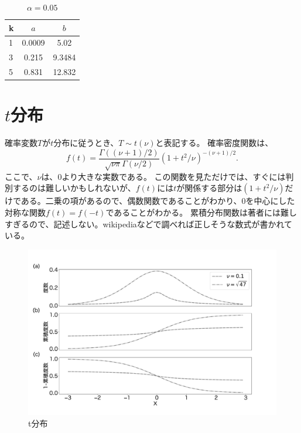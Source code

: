 \begin{table}[hbtp]
    \caption{$\alpha=0.05$}
    \label{table:chi2_confidence}
    \centering
    \begin{tabular}{lcc}
    k  & $a$   & $b$   \\
    \hline \hline
    1 &  0.0009 &  5.02\\
    3 & 0.215 & 9.3484  \\
    5 &  0.831 & 12.832 \\
      \hline
    \end{tabular}
  \end{table}

\section{$t$分布}
確率変数$T$が$t$分布に従うとき、$T \sim t(\nu)$と表記する。
確率密度関数は、
\begin{equation*}
    f(t) = \frac{\Gamma((\nu+1)/2)}{\sqrt{\nu \pi}\Gamma(\nu/2) }(1+t^2/\nu)^{-(\nu+1)/2}.
\end{equation*}
ここで、$\nu$は、$0$より大きな実数である。
この関数を見ただけでは、すぐには判別するのは難しいかもしれないが、$f(t)$には$t$が関係する部分は$(1+t^2/\nu)$だけである。二乗の項があるので、偶数関数であることがわかり、$0$を中心にした対称な関数$f(t)=f(-t)$であることがわかる。
累積分布関数は著者には難しすぎるので、記述しない。wikipediaなどで調べれば正しそうな数式が書かれている。



\begin{figure}
    \begin{center}
        \includegraphics[width=15cm]{./image/02_/student_t_frequency.pdf}
        \caption{t分布}
        \label{student_t}
    \end{center}
\end{figure}

